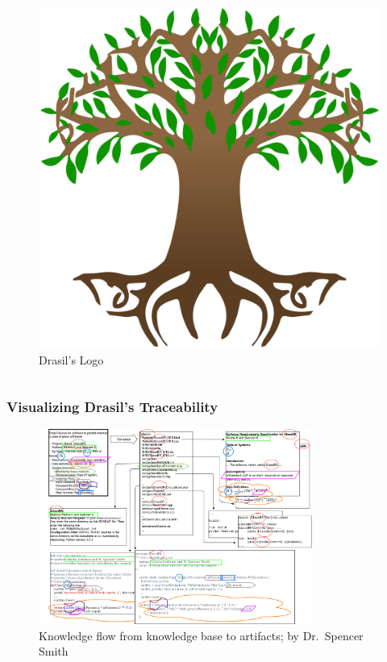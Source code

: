 \documentclass{beamer}
\begin{document}
\begin{frame}
\begin{columns}[T,onlytextwidth]
\begin{column}{.45\textwidth}
\begin{figure}
                \includegraphics[width=.8\textwidth]{assets/drasil-logo.png}
                \caption{Drasil's Logo \tiny\cite{Drasil2021}}
            \end{figure}
        \end{column}
    \end{columns}
\end{frame}

\begin{frame}
    \frametitle{Visualizing Drasil's Traceability}
    \begin{figure}
        \center
        \includegraphics[width=0.8\textwidth]{assets/DrasilSupportsChange.png}
        \vspace{-2mm}
        \caption{Knowledge flow from knowledge base to artifacts; by Dr.~Spencer Smith}
        \label{fig:knowledge-flow}
    \end{figure}
\end{frame}
\end{document}
